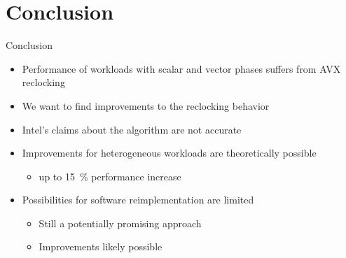 \section{Conclusion}
\begin{frame}[t]{Conclusion}
	\begin{itemize}
		\item Performance of workloads with scalar and vector phases suffers from AVX reclocking
		\item We want to find improvements to the reclocking behavior
		\item Intel's claims about the algorithm are not accurate
		\item Improvements for heterogeneous workloads are theoretically possible
		\begin{itemize}
			\item up to \SI{15}{\percent} performance increase
		\end{itemize}
		\item Possibilities for software reimplementation are limited
		\begin{itemize}
			\item Still a potentially promising approach
			\item Improvements likely possible
		\end{itemize}
	\end{itemize}
\end{frame}